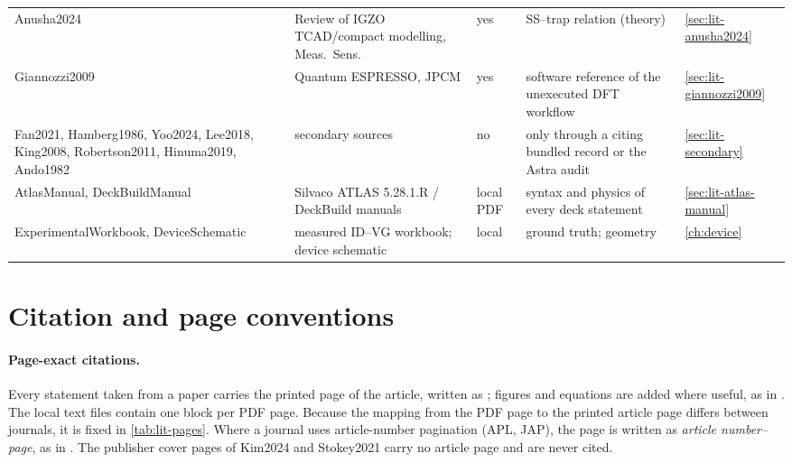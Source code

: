 \begin{table}[htbp]
\begin{tabularx}{\linewidth}{@{}>{\raggedright\arraybackslash}p{2.0cm}>{\raggedright\arraybackslash}p{3.3cm}>{\raggedright\arraybackslash}p{1.0cm}>{\raggedright\arraybackslash}X>{\raggedright\arraybackslash}p{1.5cm}@{}}
Anusha2024 & Review of IGZO TCAD/compact modelling, Meas.\ Sens.\ & yes & SS--trap relation (theory) & \cref{sec:lit-anusha2024} \\
Giannozzi2009 & Quantum ESPRESSO, JPCM & yes & software reference of the unexecuted DFT workflow & \cref{sec:lit-giannozzi2009} \\
Fan2021, Hamberg1986, Yoo2024, Lee2018, King2008, Robertson2011, Hinuma2019, Ando1982 & secondary sources & no & only through a citing bundled record or the Astra audit & \cref{sec:lit-secondary} \\
AtlasManual, DeckBuildManual & Silvaco ATLAS 5.28.1.R / DeckBuild manuals & local PDF & syntax and physics of every deck statement & \cref{sec:lit-atlas-manual} \\
ExperimentalWorkbook, DeviceSchematic & measured ID--VG workbook; device schematic & local & ground truth; geometry & \cref{ch:device} \\
\bottomrule
\end{tabularx}
\end{table}

\section{Citation and page conventions}\label{sec:lit-convention}

\paragraph{Page-exact citations.}
Every statement taken from a paper carries the printed page of the article, written as
\citep[p.~21539]{Lin2022}; figures and equations are added where useful, as in
\citep[p.~8, Fig.~5f]{Januar2026}. The local text files contain one block per PDF page. Because the
mapping from the PDF page to the printed article page differs between journals, it is fixed in
\cref{tab:lit-pages}. Where a journal uses article-number pagination (APL, JAP), the page is
written as \emph{article number--page}, as in \citep[p.~173507-6]{Kim2024}. The publisher cover
pages of Kim2024 and Stokey2021 carry no article page and are never cited.

